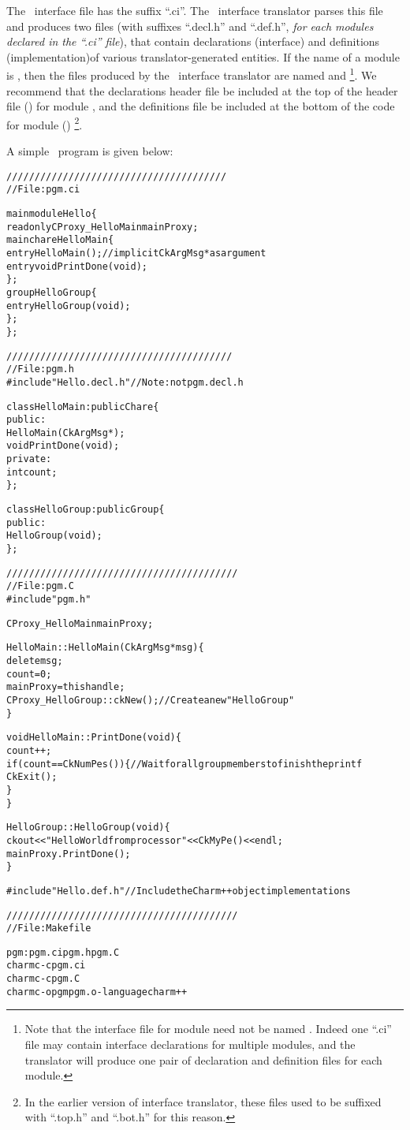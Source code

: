 The \charmpp\ interface file has the suffix ``.ci''.  The \charmpp\ interface
translator parses this file and produces two files (with suffixes ``.decl.h''
and ``.def.h'', {\em for each modules declared in the ``.ci'' file}), that
contain declarations (interface) and definitions (implementation)of various
translator-generated entities. If the name of a module is , then the
files produced by the \charmpp\ interface translator are named 
and \footnote{Note that the interface file for module 
need not be named . Indeed one ``.ci'' file may contain interface
declarations for multiple modules, and the translator will produce one pair of
declaration and definition files for each module.}.  We recommend that the
declarations header file be included at the top of the header file ()
for module , and the definitions file be included at the bottom of the
code for module () \footnote{In the earlier version of interface
translator, these files used to be suffixed with ``.top.h'' and ``.bot.h'' for
this reason.}.

A simple \charmpp\ program is given below:

\begin{alltt}
///////////////////////////////////////
// File: pgm.ci

mainmodule Hello \{
  readonly CProxy_HelloMain mainProxy;
  mainchare HelloMain \{
    entry HelloMain(); // implicit CkArgMsg * as argument
    entry void PrintDone(void);
  \};
  group HelloGroup \{
    entry HelloGroup(void);
  \};
\};

////////////////////////////////////////
// File: pgm.h
#include "Hello.decl.h" // Note: not pgm.decl.h

class HelloMain: public Chare \{
  public:
    HelloMain(CkArgMsg *);
    void PrintDone(void);
  private:
    int count;
\};

class HelloGroup: public Group \{
  public:
    HelloGroup(void);
\};

/////////////////////////////////////////
// File: pgm.C
#include "pgm.h"

CProxy_HelloMain mainProxy;

HelloMain::HelloMain(CkArgMsg *msg) \{
  delete msg;
  count = 0;
  mainProxy=thishandle;
  CProxy_HelloGroup::ckNew(); // Create a new "HelloGroup"
\}

void HelloMain::PrintDone(void) \{
  count++;
  if (count == CkNumPes()) \{ // Wait for all group members to finish the printf
    CkExit();
  \}
\}

HelloGroup::HelloGroup(void) \{
  ckout << "Hello World from processor " << CkMyPe() << endl;
  mainProxy.PrintDone();
\}

#include "Hello.def.h" // Include the Charm++ object implementations

/////////////////////////////////////////
// File: Makefile

pgm: pgm.ci pgm.h pgm.C
      charmc -c pgm.ci
      charmc -c pgm.C
      charmc -o pgm pgm.o -language charm++

\end{alltt}


